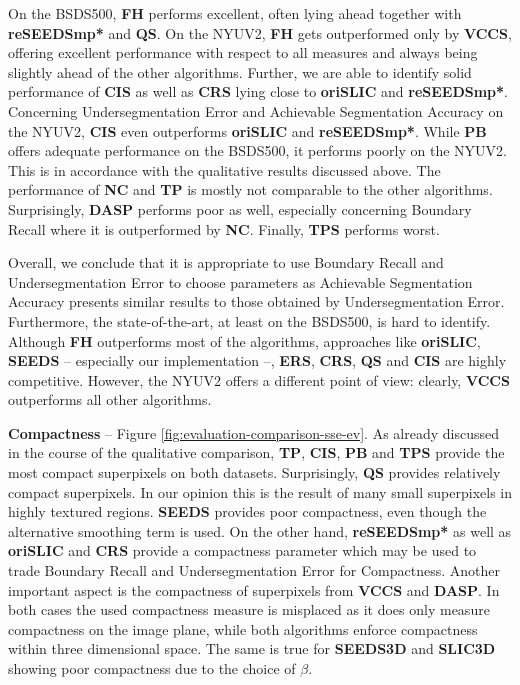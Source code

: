 On the BSDS500, \textbf{FH} performs excellent, often lying ahead together with \textbf{reSEEDSmp*} and \textbf{QS}. On the NYUV2, \textbf{FH} gets outperformed only by \textbf{VCCS}, offering excellent performance with respect to all measures and always being slightly ahead of the other algorithms. Further, we are able to identify solid performance of \textbf{CIS} as well as \textbf{CRS} lying close to \textbf{oriSLIC} and \textbf{reSEEDSmp*}. Concerning Undersegmentation Error and Achievable Segmentation Accuracy on the NYUV2, \textbf{CIS} even outperforms \textbf{oriSLIC} and \textbf{reSEEDSmp*}. While \textbf{PB} offers adequate performance on the BSDS500, it performs poorly on the NYUV2. This is in accordance with the qualitative results discussed above. The performance of \textbf{NC} and \textbf{TP} is mostly not comparable to the other algorithms. Surprisingly, \textbf{DASP} performs poor as well, especially concerning Boundary Recall where it is outperformed by \textbf{NC}. Finally, \textbf{TPS} performs worst.

Overall, we conclude that it is appropriate to use Boundary Recall and Undersegmentation Error to choose parameters as Achievable Segmentation Accuracy presents similar results to those obtained by Undersegmentation Error. Furthermore, the state-of-the-art, at least on the BSDS500, is hard to identify. Although \textbf{FH} outperforms most of the algorithms, approaches like \textbf{oriSLIC}, \textbf{SEEDS} -- especially our implementation --, \textbf{ERS}, \textbf{CRS}, \textbf{QS} and \textbf{CIS} are highly competitive. However, the NYUV2 offers a different point of view: clearly, \textbf{VCCS} outperforms all other algorithms.

\textbf{Compactness} -- Figure \ref{fig:evaluation-comparison-sse-ev}.
As already discussed in the course of the qualitative comparison, \textbf{TP}, \textbf{CIS}, \textbf{PB} and \textbf{TPS} provide the most compact superpixels on both datasets. Surprisingly, \textbf{QS} provides relatively compact superpixels. In our opinion this is the result of many small superpixels in highly textured regions. \textbf{SEEDS} provides poor compactness, even though the alternative smoothing term is used. On the other hand, \textbf{reSEEDSmp*} as well as \textbf{oriSLIC} and \textbf{CRS} provide a compactness parameter which may be used to trade Boundary Recall and Undersegmentation Error for Compactness. Another important aspect is the compactness of superpixels from \textbf{VCCS} and \textbf{DASP}. In both cases the used compactness measure is misplaced as it does only measure compactness on the image plane, while both algorithms enforce compactness within three dimensional space. The same is true for \textbf{SEEDS3D} and \textbf{SLIC3D} showing poor compactness due to the choice of $\beta$.


